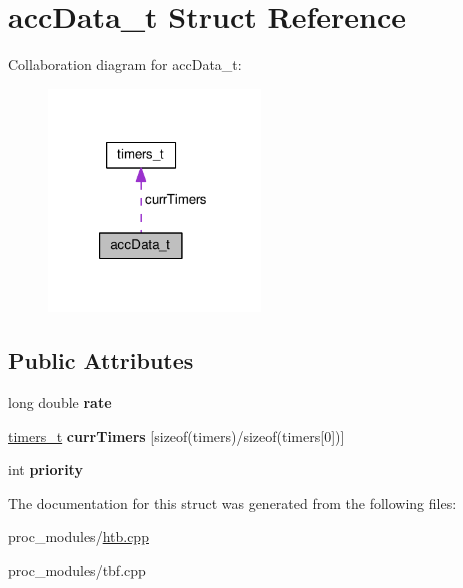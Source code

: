 \hypertarget{structaccData__t}{}\section{acc\+Data\+\_\+t Struct Reference}
\label{structaccData__t}


Collaboration diagram for acc\+Data\+\_\+t\+:
\nopagebreak
\begin{figure}[H]
\begin{center}
\leavevmode
\includegraphics[width=160pt]{structaccData__t__coll__graph}
\end{center}
\end{figure}
\subsection*{Public Attributes}
\begin{DoxyCompactItemize}
\item 
\mbox{\label{structaccData__t_a859abfd6c5404dced9d7a97c47c387fc}} 
long double {\bfseries rate}
\item 
\mbox{\label{structaccData__t_aba708e064c9e6733c3dff480d95344ed}} 
\hyperlink{structtimers__t}{timers\+\_\+t} {\bfseries curr\+Timers} \mbox{[}sizeof(timers)/sizeof(timers\mbox{[}0\mbox{]})\mbox{]}
\item 
\mbox{\label{structaccData__t_ab78550adb7a688c78ef8995de5b89bff}} 
int {\bfseries priority}
\end{DoxyCompactItemize}


The documentation for this struct was generated from the following files\+:\begin{DoxyCompactItemize}
\item 
proc\+\_\+modules/\hyperlink{htb_8cpp}{htb.\+cpp}\item 
proc\+\_\+modules/tbf.\+cpp\end{DoxyCompactItemize}
